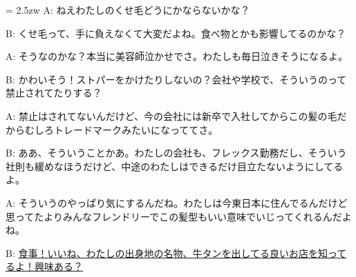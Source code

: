 \documentclass[11pt]{amsart}
\title{}
\author{}
\newenvironment{hangall}[1]{\hangindent = 2.5zw\everypar{\hangindent = 2.5zw}}{}
\begin{document}
\maketitle
\begin{hangall}{}%
A: ねえわたしのくせ毛どうにかならないかな？

B: くせ毛って、手に負えなくて大変だよね。食べ物とかも影響してるのかな？

A: そうなのかな？本当に美容師泣かせでさ。わたしも毎日泣きそうになるよ。

B: かわいそう！ストパーをかけたりしないの？会社や学校で、そういうのって禁止されてたりする？

A: 禁止はされてないんだけど、今の会社には新卒で入社してからこの髪の毛だからむしろトレードマークみたいになっててさ。

B: ああ、そういうことかあ。わたしの会社も、フレックス勤務だし、そういう社則も緩めなほうだけど、中途のわたしはできるだけ目立たないようにしてるよ。

A: そういうのやっぱり気にするんだね。わたしは今東日本に住んでるんだけど思ってたよりみんなフレンドリーでこの髪型もいい意味でいじってくれるんだよね。

B: \ul{食事！いいね、わたしの出身地の名物、牛タンを出してる良いお店を知ってるよ！興味ある？}\end{hangall}
\end{document}
